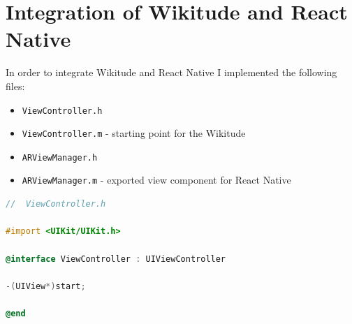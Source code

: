 \documentclass[thesis=M,english]{FITthesis}[2012/10/20]
\begin{document}
\chapter{Integration of Wikitude and React Native}
\label{apendix:integration}
In order to integrate Wikitude and React Native I implemented the following files:
\begin{itemize}
\item \verb|ViewController.h| 
\item \verb|ViewController.m| - starting point for the Wikitude
\item \verb|ARViewManager.h|
\item \verb|ARViewManager.m| - exported view component for React Native
\end{itemize}

\begin{lstlisting}[language=C]
//  ViewController.h

#import <UIKit/UIKit.h>

@interface ViewController : UIViewController

-(UIView*)start;

@end

\end{lstlisting}
\end{document}
